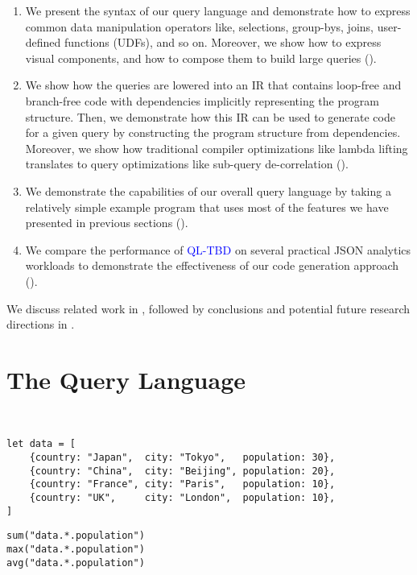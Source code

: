 \documentclass[runningheads]{llncs}
\newcommand{\lang}{\textcolor{blue}{QL-TBD}}
\begin{document}
\begin{enumerate}
    \item We present the syntax of our query language and demonstrate how to express common
          data manipulation operators like, selections, group-bys, joins, user-defined functions (UDFs),
          and so on.
          Moreover, we show how to express visual components, and how to compose them to build
          large queries ().
    \item We show how the queries are lowered into an IR that contains loop-free and branch-free code
          with dependencies implicitly representing the program structure.
          Then, we demonstrate how this IR can be used to generate code for a given query by constructing
          the program structure from dependencies.
          Moreover, we show how traditional compiler optimizations like lambda lifting translates to query
          optimizations like sub-query de-correlation ().
    \item We demonstrate the capabilities of our overall query language by taking a relatively simple example
          program that uses most of the features we have presented in previous sections ().
    \item We compare the performance of \lang{} on several practical JSON analytics workloads to demonstrate the
          effectiveness of our code generation approach ().
\end{enumerate}

We discuss related work in , followed by conclusions and potential future research directions
in .


\section{The Query Language}~\label{sec:query_language}
\begin{lstlisting}[style=JavaScript]
let data = [
    {country: "Japan",  city: "Tokyo",   population: 30},
    {country: "China",  city: "Beijing", population: 20},
    {country: "France", city: "Paris",   population: 10},
    {country: "UK",     city: "London",  population: 10},
]
\end{lstlisting}

\begin{lstlisting}[style=JavaScript]
sum("data.*.population")
max("data.*.population")
avg("data.*.population")

\end{lstlisting}
\end{document}
